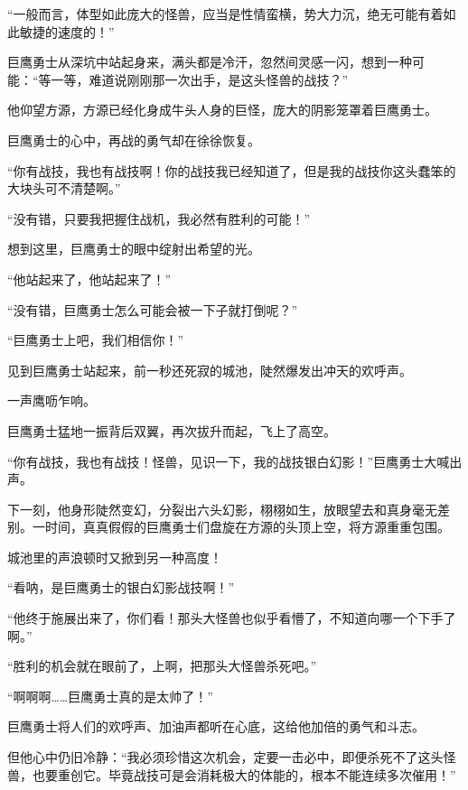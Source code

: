 
\begin{this_body}



“一般而言，体型如此庞大的怪兽，应当是性情蛮横，势大力沉，绝无可能有着如此敏捷的速度的！”

巨鹰勇士从深坑中站起身来，满头都是冷汗，忽然间灵感一闪，想到一种可能：“等一等，难道说刚刚那一次出手，是这头怪兽的战技？”

他仰望方源，方源已经化身成牛头人身的巨怪，庞大的阴影笼罩着巨鹰勇士。

巨鹰勇士的心中，再战的勇气却在徐徐恢复。

“你有战技，我也有战技啊！你的战技我已经知道了，但是我的战技你这头蠢笨的大块头可不清楚啊。”

“没有错，只要我把握住战机，我必然有胜利的可能！”

想到这里，巨鹰勇士的眼中绽射出希望的光。

“他站起来了，他站起来了！”

“没有错，巨鹰勇士怎么可能会被一下子就打倒呢？”

“巨鹰勇士上吧，我们相信你！”

见到巨鹰勇士站起来，前一秒还死寂的城池，陡然爆发出冲天的欢呼声。

一声鹰呖乍响。

巨鹰勇士猛地一振背后双翼，再次拔升而起，飞上了高空。

“你有战技，我也有战技！怪兽，见识一下，我的战技银白幻影！”巨鹰勇士大喊出声。

下一刻，他身形陡然变幻，分裂出六头幻影，栩栩如生，放眼望去和真身毫无差别。一时间，真真假假的巨鹰勇士们盘旋在方源的头顶上空，将方源重重包围。

城池里的声浪顿时又掀到另一种高度！

“看呐，是巨鹰勇士的银白幻影战技啊！”

“他终于施展出来了，你们看！那头大怪兽也似乎看懵了，不知道向哪一个下手了啊。”

“胜利的机会就在眼前了，上啊，把那头大怪兽杀死吧。”

“啊啊啊……巨鹰勇士真的是太帅了！”

巨鹰勇士将人们的欢呼声、加油声都听在心底，这给他加倍的勇气和斗志。

但他心中仍旧冷静：“我必须珍惜这次机会，定要一击必中，即便杀死不了这头怪兽，也要重创它。毕竟战技可是会消耗极大的体能的，根本不能连续多次催用！”


\end{this_body}

